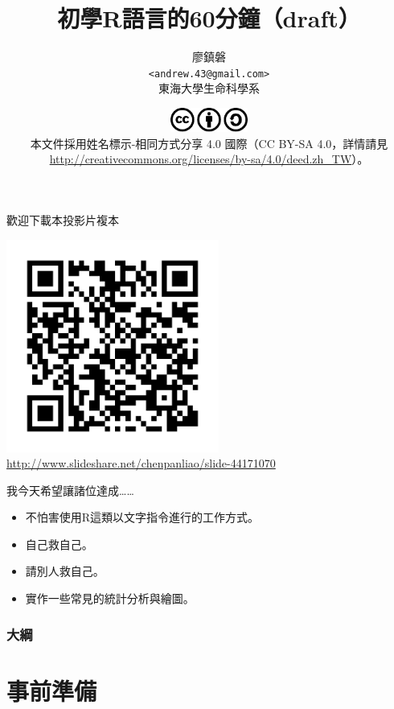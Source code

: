 \documentclass[12pt]{beamer}
\title[初學者學習R語言]{初學R語言的60分鐘（draft）}
\author[廖鎮磐]{廖鎮磐 \\ \texttt{<andrew.43@gmail.com>}\\ 東海大學生命科學系}
\institute{\normalsize 2015年3月14日於蓮華池}
\date{\footnotesize \includegraphics[width=1in]{cc.pdf}\\[5pt]
本文件採用姓名標示-相同方式分享 4.0 國際（CC BY-SA 4.0，詳情請見 \url{http://creativecommons.org/licenses/by-sa/4.0/deed.zh_TW}）。}
\begin{document}
\begin{frame}
\titlepage
\end{frame}

\begin{frame}{歡迎下載本投影片複本}
\begin{center}
\includegraphics[width=2.75in]{url.pdf}\\
\footnotesize\url{http://www.slideshare.net/chenpanliao/slide-44171070}
\end{center}
\end{frame}

\begin{frame}{我今天希望讓諸位達成\ldots\ldots}
\begin{itemize}
\item 不怕害使用R這類以文字指令進行的工作方式。
\item 自己救自己。
\item 請別人救自己。
\item 實作一些常見的統計分析與繪圖。
\end{itemize}
\end{frame}


\begin{frame}
\frametitle{大綱}
\tableofcontents
\end{frame}

\section{事前準備}\subsection{}
\end{document}
